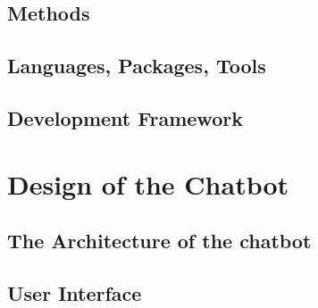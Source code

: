 \documentclass[11pt]{article}
\begin{document}
\subsection{Methods} \label{methods}

   



             
\subsection{Languages, Packages, Tools} \label{languages-packages-tools}




 
\subsection{Development Framework} \label{development-framework}


\section{Design of the Chatbot} \label{design}

 
\subsection{The Architecture of the chatbot} \label{architecture}

\subsection{User Interface} \label{user-interface}
\end{document}
